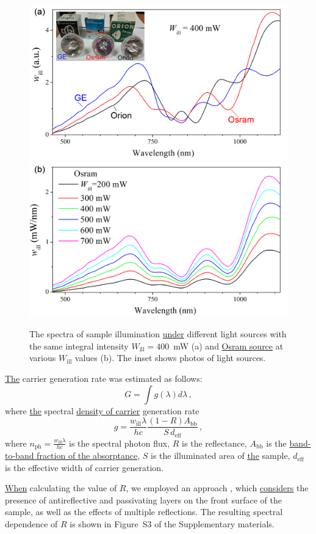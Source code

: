 \documentclass{WileyMSP-template}
\begin{document}
\begin{figure}
\centering
  \includegraphics[width=0.4\linewidth]{Fig4a.png}
  \includegraphics[width=0.4\linewidth]{Fig4b.png}
  \caption{
  The spectra of sample illumination \textcolor[rgb]{0.00,0.07,1.00}{\uline{under}} different light sources with the same integral intensity $W_\mathrm{ill}=400$~mW (a)
  and \textcolor[rgb]{0.00,0.07,1.00}{\uline{Osram source}} at various $W_\mathrm{ill}$ values (b).
 The inset shows photos of light sources.
}
  \label{fig4}
\end{figure}


\textcolor[rgb]{0.00,0.07,1.00}{\uline{The}} carrier generation rate was estimated as follows:
\begin{equation}
\label{eqGint}
G=\int g(\lambda) d\lambda\,,
\end{equation}
where \textcolor[rgb]{0.00,0.07,1.00}{\uline{the}} spectral \textcolor[rgb]{0.00,0.07,1.00}{\uline{density of carrier}} generation rate
\begin{equation}
\label{eqGspectr}
g=\frac{w_\mathrm{ill}\lambda}{hc}\frac{(1-R)A_\mathrm{bb}}{S\,d_\mathrm{eff}}\,,
\end{equation}
where $n_\mathrm{ph}=\frac{w_\mathrm{ill}\lambda}{hc}$ is the spectral photon flux,
$R$ is the reflectance,
$A_\mathrm{bb}$ is the \textcolor[rgb]{0.00,0.07,1.00}{\uline{band-to-band fraction of the absorptance}},
$S$ is the illuminated area of \textcolor[rgb]{0.00,0.07,1.00}{\uline{the}} sample,
$d_\mathrm{eff}$ is the effective width of carrier generation.

\textcolor[rgb]{0.00,0.07,1.00}{\uline{When}} calculating the value of $R$, we employed an approach \cite{KostRefl2000},
which \textcolor[rgb]{0.00,0.07,1.00}{\uline{considers}} the presence of antireflective and passivating layers on the front surface of the sample,
as well as the effects of multiple reflections.
The resulting spectral dependence of $R$ is shown in Figure~S3 of the Supplementary materials.
\end{document}
